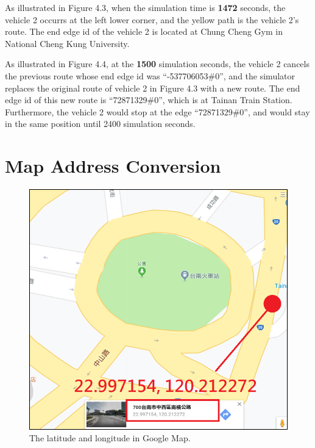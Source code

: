 \documentclass[12pt]{ksthesis}
\begin{document}
\begin{thesis}
{As illustrated in Figure 4.3, when the simulation time is \textbf{1472} seconds, the vehicle 2 occurrs at the left lower corner, and the yellow path is the vehicle 2’s route. 
The end edge id of the vehicle 2 is located at Chung Cheng Gym in National Cheng Kung University.


As illustrated in Figure 4.4, at the \textbf{1500} simulation seconds, the vehicle 2 cancels the previous route whose end edge id was “-537706053\#0”, and the simulator replaces the original route of vehicle 2 in Figure 4.3 with a new route. The end edge id of this new route is “72871329\#0”, which is at Tainan Train Station. Furthermore, the vehicle 2 would stop at the edge “72871329\#0”, and would stay in the same position until 2400 simulation seconds.



\section{Map Address Conversion}

\begin{figure}[H]
\centering

\includegraphics[scale=1.0]{./Thesis_figures/F4-5_GPS_googleMap.PNG}
\caption{\large The latitude and longitude in Google Map.}
\vspace{0.5cm}
\label{Fig:GPS_in_GoggleMap}
\end{figure}


}
\end{thesis}
\end{document}
